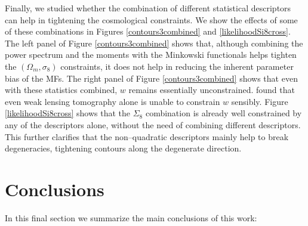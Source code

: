 \documentclass[reprint,aps,prd,superscriptaddress,showkeys,showpacs]{revtex4-1}
\begin{document}
Finally, we studied whether the combination of different statistical
descriptors can help in tightening the cosmological constraints. We
show the effects of some of these combinations in Figures
\ref{contours3combined} and \ref{likelihoodSi8cross}. The left panel
of Figure \ref{contours3combined} shows that, although combining the
power spectrum and the moments with the Minkowski functionals helps
tighten the $(\Omega_m,\sigma_8)$ constraints, it does not help in
reducing the inherent parameter bias of the MFs. The right panel of Figure
\ref{contours3combined} shows that even with these statistics
combined, $w$ remains essentially unconstrained. \citep{CFHTHeymansTomo} found that even weak lensing tomography alone is unable to constrain $w$ sensibly. 
Figure \ref{likelihoodSi8cross} shows that the $\Sigma_8$ combination is
already well constrained by any of the descriptors alone, without the
need of combining different descriptors.
This further clarifies that the non--quadratic descriptors mainly help
to break degeneracies, tightening contours along the
degenerate direction.



\section{Conclusions}

In this final section we summarize the main conclusions of this work:
\end{document}
